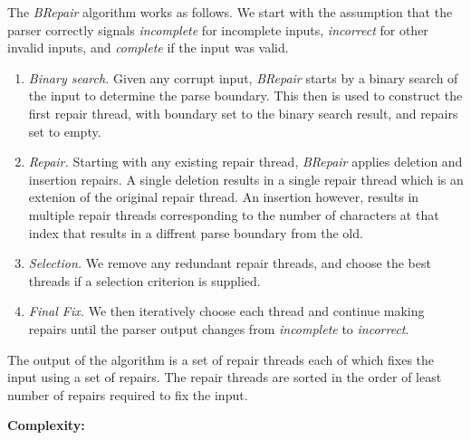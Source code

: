 \documentclass[sigconf,review,anonymous]{acmart}
\makeatletter
\newcounter{todocounter}
\newcommand{\todo}[1]{\marginpar{$|$}\textcolor{red}{\stepcounter{todocounter}\footnote[\thetodocounter]{\textcolor{red}{\textbf{TODO }}\textit{#1}}}}
\renewcommand{\todo}[1]{}
\newcommand{\approach}{\textsc{BRepair}\xspace}
\newcommand{\ddmax}{\textit{DDMax}\xspace}
\newcommand{\brepair}{\textit{BRepair}\xspace}
\newcommand\letterboxed[1]{%
\setlength{\fboxsep}{0pt}%
  \@tfor\@ii:=#1\do{%
    \fcolorbox{white}{light-gray}{\texttt{\strut\@ii}}%
  }%
}
\makeatother
\begin{document}
The \brepair algorithm works as follows.
We start with the assumption that the parser correctly signals
\emph{incomplete} for incomplete inputs, \emph{incorrect} for other invalid
inputs, and \emph{complete} if the input was valid.\todo{we need to sync these steps with the workflow diagram (\autoref{fig:brepair_flowchart}), and also name/number steps 1,2, ...}

\begin{enumerate}
\item \emph{Binary search.} Given any corrupt input, \brepair starts by a
binary search of the input to determine the parse boundary. This then is used
to construct the first repair thread, with boundary set to the binary search
result, and repairs set to empty.

\item \emph{Repair.} Starting with any existing repair thread, \brepair applies
deletion and insertion repairs. A single deletion results in a single repair
thread which is an extenion of the original repair thread.
An insertion however, results in multiple repair threads corresponding to the
number of characters at that index that results in a diffrent parse boundary from
the old.

\item \emph{Selection.} We remove any redundant repair threads, and choose the best threads if a
selection criterion is supplied.

\item \emph{Final Fix.} We then iteratively choose each thread and continue making repairs
until the parser output changes from \emph{incomplete} to \emph{incorrect}.
\end{enumerate}

The output of the algorithm is a set of repair threads each of which fixes the
input using a set of repairs. The repair threads are sorted in the order of
least number of repairs required to fix the input.

\noindent
\textbf{Complexity:}\todo{what is the space/time complexity of the \approach, and how does this compare to that of \ddmax. }


%
\end{document}
